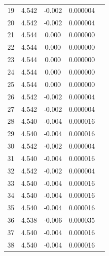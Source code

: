 \begin{center}
\begin{table}[H]
\begin{tabular}{|c|c|c|c|c|}
19 &  4.542  &  -0.002 & 0.000004 \\
20 &  4.542  &  -0.002 & 0.000004 \\
21 &  4.544  &  0.000 & 0.000000 \\
22 &  4.544  &  0.000 & 0.000000 \\
23 &  4.544  &  0.000 & 0.000000 \\
24 &  4.544  &  0.000 & 0.000000 \\
25 &  4.544  &  0.000 & 0.000000 \\
26 &  4.542  &  -0.002 & 0.000004 \\
27 &  4.542  &  -0.002 & 0.000004 \\
28 &  4.540  &  -0.004 & 0.000016 \\
29 &  4.540  &  -0.004 & 0.000016 \\
30 &  4.542  &  -0.002 & 0.000004 \\
31 &  4.540  &  -0.004 & 0.000016 \\
32 &  4.542  &  -0.002 & 0.000004 \\
33 &  4.540  &  -0.004 & 0.000016 \\
34 &  4.540  &  -0.004 & 0.000016 \\
35 &  4.540  &  -0.004 & 0.000016 \\
36 &  4.538  &  -0.006 & 0.000035 \\
37 &  4.540  &  -0.004 & 0.000016 \\
38 &  4.540  &  -0.004 & 0.000016 \\
\end{tabular}
\end{table}
\end{center}

